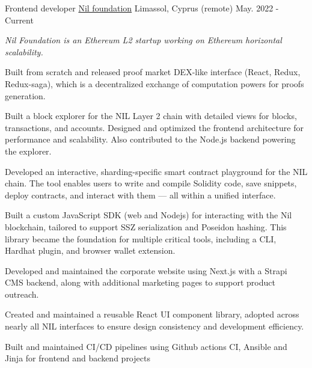 

\begin{cventries}

  \cventry
    {Frontend developer} %
    {\href{https://nil.foundation}{Nil foundation}} %
    {Limassol, Cyprus (remote)} %
    {May. 2022 - Current} %
    {
      \begin{cvitems} %
      \vspace{8pt}
      \item[] {\small\textit{Nil Foundation is an Ethereum L2 startup working on Ethereum horizontal scalability.}}
      \vspace{8pt}
        \item {Built from scratch and released proof market DEX-like interface (React, Redux, Redux-saga), which is a decentralized exchange of computation powers for proofs generation.}
        \item {Built a block explorer for the NIL Layer 2 chain with detailed views for blocks, transactions, and accounts. Designed and optimized the frontend architecture for performance and scalability. Also contributed to the Node.js backend powering the explorer.}
        \item {Developed an interactive, sharding-specific smart contract playground for the NIL chain. The tool enables users to write and compile Solidity code, save snippets, deploy contracts, and interact with them — all within a unified interface.}
        \item {Built a custom JavaScript SDK (web and Nodejs) for interacting with the Nil blockchain, tailored to support SSZ serialization and Poseidon hashing. This library became the foundation for multiple critical tools, including a CLI, Hardhat plugin, and browser wallet extension.}
        \item {Developed and maintained the corporate website using Next.js with a Strapi CMS backend, along with additional marketing pages to support product outreach.}
        \item {Created and maintained a reusable React UI component library, adopted across nearly all NIL interfaces to ensure design consistency and development efficiency.}
        \item {Built and maintained CI/CD pipelines using Github actions CI, Ansible and Jinja for frontend and backend projects}
      \end{cvitems}
    }
    {\vspace{16pt}}


\end{cventries}
